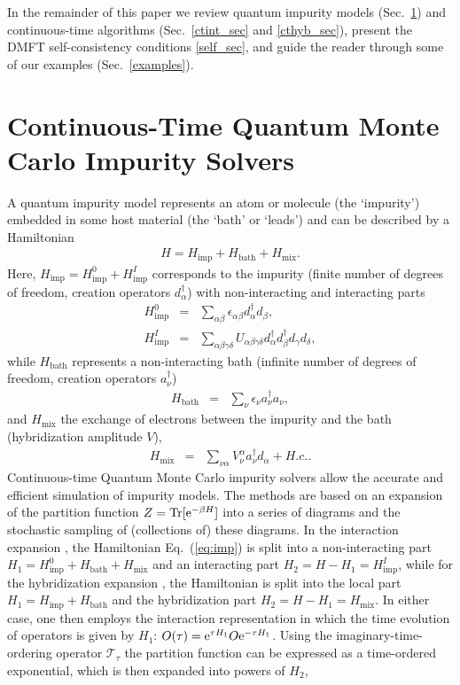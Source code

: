 \documentclass[3p,twocolumn]{elsarticle}
\begin{document}
In the remainder of this paper we review quantum impurity models (Sec.~\ref{intro_sec}) and continuous-time algorithms (Sec.~\ref{ctint_sec} and \ref{cthyb_sec}), present the DMFT self-consistency conditions \ref{self_sec}, and guide the reader through some of our examples (Sec.~\ref{examples}).

\section{Continuous-Time Quantum Monte Carlo Impurity Solvers}
\label{intro_sec}
A quantum impurity model represents an atom or molecule (the `impurity') embedded in some host material (the `bath' or `leads') and can be described by a Hamiltonian
\begin{align}\label{eq:imp}
H=H_\text{imp}+H_\text{bath}+H_\text{mix}.
\end{align}
Here, $H_\text{imp}=H_\text{imp}^0+H_\text{imp}^I$ corresponds to the impurity (finite number of degrees of freedom, creation operators $d^\dagger_\alpha$) with non-interacting and interacting parts
%
\begin{eqnarray}
H_\text{imp}^0 &=& \sum_{\alpha\beta} \epsilon_{\alpha\beta} d^\dagger_\alpha d_\beta,\\
H_\text{imp}^I &=& \sum_{\alpha\beta\gamma\delta} U_{\alpha\beta\gamma\delta} d^\dagger_\alpha d^\dagger_\beta d_\gamma d_\delta,
\end{eqnarray} 
%
while $H_\text{bath}$ represents a non-interacting bath (infinite number of degrees of freedom, creation operators $a^\dagger_\nu$)
%
\begin{eqnarray}
H_\text{bath} &=& \sum_{\nu} \epsilon_{\nu} a^\dagger_\nu a_\nu,
\end{eqnarray} 
%
and $H_\text{mix}$ the exchange of electrons between the impurity and the bath (hybridization amplitude $V$),
%
\begin{eqnarray}
H_\text{mix} &=& \sum_{\nu\alpha} V_{\nu}^\alpha a^\dagger_\nu d_\alpha + H. c..
\end{eqnarray} 
%
Continuous-time Quantum Monte Carlo impurity solvers allow the accurate and efficient simulation of impurity models. The methods are based on an expansion of the partition function $Z=\text{Tr}[{\rm e}^{-\beta H}]$ into a series of diagrams and the stochastic sampling of (collections of) these diagrams. In the interaction expansion \cite{Rubtsov04,Rubtsov05}, the Hamiltonian Eq.~(\ref{eq:imp}) is split into a non-interacting part $H_1=H_\text{imp}^0+H_\text{bath}+H_\text{mix}$ and an interacting part $H_2=H-H_1=H_\text{imp}^I$, while for the hybridization expansion \cite{Werner06, Werner06Kondo}, the Hamiltonian is split into the local part $H_1=H_\text{imp}+H_\text{bath}$ and the hybridization part $H_2=H-H_1=H_\text{mix}$. In either case, one then employs the interaction representation in which the time evolution of operators is given by $H_1$: $O(\tau)={\rm e}^{\tau H_1}O {\rm e}^{-\tau H_1}$. Using the imaginary-time-ordering operator $\mathcal{T}_{\tau}$ the partition function can be expressed as a time-ordered exponential, which is then expanded into powers of $H_2$,
\end{document}
